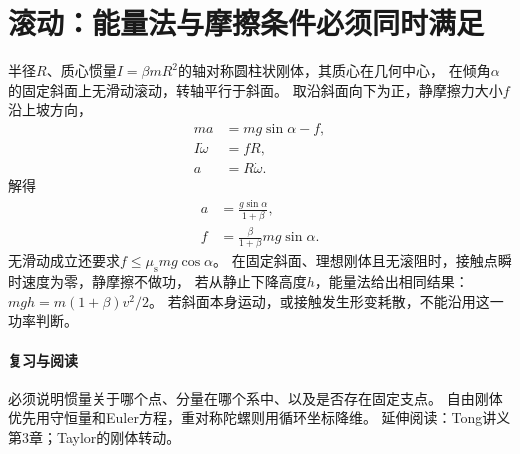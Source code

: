 \section{滚动：能量法与摩擦条件必须同时满足}
半径$R$、质心惯量$I = \beta mR^2$的轴对称圆柱状刚体，其质心在几何中心，
在倾角$\alpha$的固定斜面上无滑动滚动，转轴平行于斜面。
取沿斜面向下为正，静摩擦力大小$f$沿上坡方向，
\begin{subequations}
 \begin{align}
  ma &= mg\sin\alpha - f,\\
  I\dot\omega &= fR,\\
  a &= R\dot\omega.
 \end{align}
\end{subequations}
解得
\begin{subequations}
 \begin{align}
  a &= \frac{g\sin\alpha}{1 + \beta},\\
  f &= \frac{\beta}{1 + \beta}mg\sin\alpha.
 \end{align}
\end{subequations}
无滑动成立还要求$f \leq \mu_{\mathrm s}mg\cos\alpha$。
在固定斜面、理想刚体且无滚阻时，接触点瞬时速度为零，静摩擦不做功，
若从静止下降高度$h$，能量法给出相同结果：$mgh = m(1 + \beta)v^2/2$。
若斜面本身运动，或接触发生形变耗散，不能沿用这一功率判断。

\paragraph{复习与阅读}
必须说明惯量关于哪个点、分量在哪个系中、以及是否存在固定支点。
自由刚体优先用守恒量和Euler方程，重对称陀螺则用循环坐标降维。
延伸阅读：Tong讲义第3章；Taylor的刚体转动。

